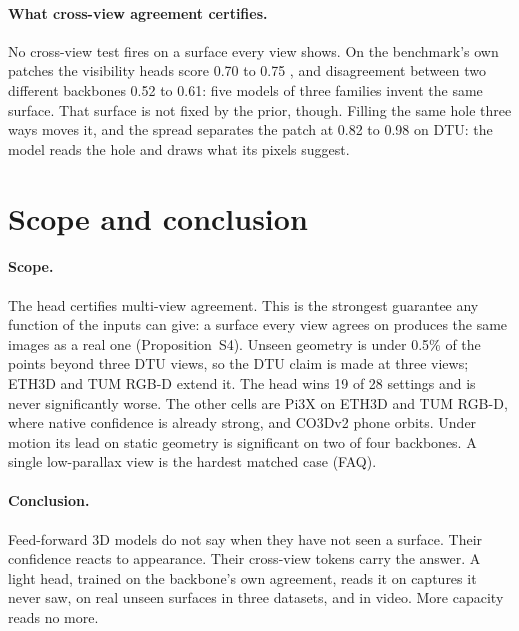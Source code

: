 \documentclass[10pt,twocolumn,letterpaper]{article}
\begin{document}
\paragraph{What cross-view agreement certifies.}
No cross-view test fires on a surface every view shows. On the benchmark's own patches the visibility heads score 0.70 to 0.75 \auroc{}, and disagreement between two different backbones 0.52 to 0.61: five models of three families invent the same surface. That surface is not fixed by the prior, though. Filling the same hole three ways moves it, and the spread separates the patch at \auroc{} 0.82 to 0.98 on DTU: the model reads the hole and draws what its pixels suggest.


\section{Scope and conclusion}
\label{sec:limits}

\paragraph{Scope.}
The head certifies multi-view agreement. This is the strongest guarantee any function of the inputs can give: a surface every view agrees on produces the same images as a real one (Proposition~S4).
Unseen geometry is under 0.5\% of the points beyond three DTU views, so the DTU claim is made at three views; ETH3D and TUM RGB-D extend it. The head wins 19 of 28 settings and is never significantly worse. The other cells are Pi3X on ETH3D and TUM RGB-D, where native confidence is already strong, and CO3Dv2 phone orbits.
Under motion its lead on static geometry is significant on two of four backbones. A single low-parallax view is the hardest matched case (FAQ).

\paragraph{Conclusion.} Feed-forward 3D models do not say when they have not seen a surface. Their confidence reacts to appearance. Their cross-view tokens carry the answer. A light head, trained on the backbone's own agreement, reads it on captures it never saw, on real unseen surfaces in three datasets, and in video. More capacity reads no more.
\end{document}
